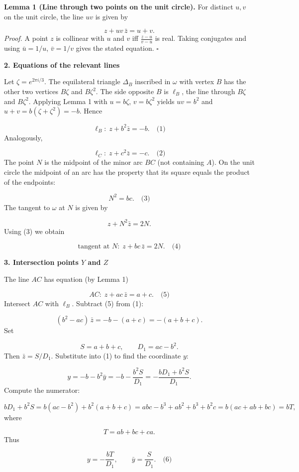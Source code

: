 \documentclass{llmxive}
\providecommand{\solutionheading}[1]{\par\smallskip\noindent\textbf{#1}\par}
\begin{document}
\textbf{Lemma 1 (Line through two points on the unit circle).} For distinct \(u,v\) on the unit circle, the line \(uv\) is given by\par
\[
z + uv\,\bar{z} = u+v.
\]
\emph{Proof.} A point \(z\) is collinear with \(u\) and \(v\) iff \(\frac{z-u}{v-u}\) is real. Taking conjugates and using \(\bar u = 1/u\), \(\bar v = 1/v\) gives the stated equation. \(\square\)\par
\smallskip
\solutionheading{2. Equations of the relevant lines}
Let \(\zeta = e^{2\pi i/3}\). The equilateral triangle \(\Delta_B\) inscribed in \(\omega\) with vertex \(B\) has the other two vertices \(B\zeta\) and \(B\zeta^2\). The side opposite \(B\) is \(\ell_B\), the line through \(B\zeta\) and \(B\zeta^2\). Applying Lemma 1 with \(u = b\zeta\), \(v = b\zeta^2\) yields \(uv = b^2\) and \(u+v = b(\zeta+\zeta^2) = -b\). Hence\par
\[
\ell_B:\; z + b^2\bar{z} = -b. \quad\text{(1)}
\]
Analogously,\par
\[
\ell_C:\; z + c^2\bar{z} = -c. \quad\text{(2)}
\]
The point \(N\) is the midpoint of the minor arc \(BC\) (not containing \(A\)). On the unit circle the midpoint of an arc has the property that its square equals the product of the endpoints:\par
\[
N^2 = bc. \quad\text{(3)}
\]
The tangent to \(\omega\) at \(N\) is given by\par
\[
z + N^2\bar{z} = 2N.
\]
Using (3) we obtain\par
\[
\text{tangent at }N:\; z + bc\,\bar{z} = 2N. \quad\text{(4)}
\]
\smallskip
\solutionheading{3. Intersection points \(Y\) and \(Z\)}
The line \(AC\) has equation (by Lemma 1)\par
\[
AC:\; z + ac\,\bar{z} = a + c. \quad\text{(5)}
\]
Intersect \(AC\) with \(\ell_B\). Subtract (5) from (1):\par
\[
(b^2 - ac)\,\bar{z} = -b - (a+c) = -(a+b+c).
\]
Set\par
\[
S = a+b+c,\qquad D_1 = ac - b^2.
\]
Then \(\bar{z} = S/D_1\). Substitute into (1) to find the coordinate \(y\):\par
\[
y = -b - b^2\bar{y} = -b - \frac{b^2 S}{D_1} = -\frac{b D_1 + b^2 S}{D_1}.
\]
Compute the numerator:\par
\[
b D_1 + b^2 S = b(ac - b^2) + b^2(a+b+c) = abc - b^3 + ab^2 + b^3 + b^2c = b(ac + ab + bc) = b T,
\]
where\par
\[
T = ab + bc + ca.
\]
Thus\par
\[
y = -\frac{b T}{D_1},\qquad \bar{y} = \frac{S}{D_1}. \quad\text{(6)}
\]
\end{document}
